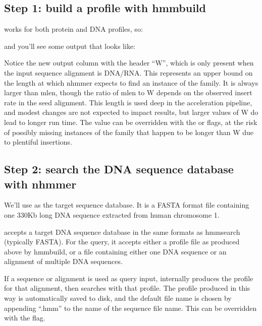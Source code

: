 \subsection{Step 1: build a profile with hmmbuild}

 works for both protein and DNA profiles, so:

   \vspace{1ex}
   \vspace{1ex}

and you'll see some output that looks like:



Notice the new output column with the header ``W'', which is only
present when the input sequence alignment is DNA/RNA. This represents
an upper bound on the length at which nhmmer expects to find an
instance of the family.  It is always larger than mlen,
though the ratio of mlen to W depends on the observed insert rate in
the seed alignment. This length is used deep in the acceleration
pipeline, and modest changes are not expected to impact results, but
larger values of W do lead to longer run time. The value can be
overridden with the  or  flags, at
the risk of possibly missing instances of the family that happen to be
longer than W due to plentiful insertions.



\subsection{Step 2: search the DNA sequence database with nhmmer}

We'll use  as the target sequence
database. It is a FASTA format file containing one 330Kb long DNA
sequence extracted from human chromosome 1.

 accepts a target DNA sequence database in the same
formats as hmmsearch (typically FASTA). For the query, it accepts
either a profile file as produced above by hmmbuild, or a file
containing either one DNA sequence or an alignment of multiple DNA
sequences.

If a sequence or alignment is used as query input, 
internally produces the profile for that alignment, then searches with that
profile. The profile produced in this way is automatically saved to
disk, and the default file name is chosen by appending ``.hmm'' to the
name of the sequence file name. This can be overridden with the
 flag.

